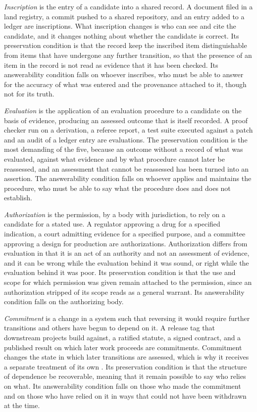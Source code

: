 \emph{Inscription} is the entry of a candidate into a shared record. A document filed in a land registry, a commit pushed to a shared repository, and an entry added to a ledger are inscriptions. What inscription changes is who can see and cite the candidate, and it changes nothing about whether the candidate is correct. Its preservation condition is that the record keep the inscribed item distinguishable from items that have undergone any further transition, so that the presence of an item in the record is not read as evidence that it has been checked. Its answerability condition falls on whoever inscribes, who must be able to answer for the accuracy of what was entered and the provenance attached to it, though not for its truth.

\emph{Evaluation} is the application of an evaluation procedure to a candidate on the basis of evidence, producing an assessed outcome that is itself recorded. A proof checker run on a derivation, a referee report, a test suite executed against a patch and an audit of a ledger entry are evaluations. The preservation condition is the most demanding of the five, because an outcome without a record of what was evaluated, against what evidence and by what procedure cannot later be reassessed, and an assessment that cannot be reassessed has been turned into an assertion. The answerability condition falls on whoever applies and maintains the procedure, who must be able to say what the procedure does and does not establish.

\emph{Authorization} is the permission, by a body with jurisdiction, to rely on a candidate for a stated use. A regulator approving a drug for a specified indication, a court admitting evidence for a specified purpose, and a committee approving a design for production are authorizations. Authorization differs from evaluation in that it is an act of an authority and not an assessment of evidence, and it can be wrong while the evaluation behind it was sound, or right while the evaluation behind it was poor. Its preservation condition is that the use and scope for which permission was given remain attached to the permission, since an authorization stripped of its scope reads as a general warrant. Its answerability condition falls on the authorizing body.

\emph{Commitment} is a change in a system such that reversing it would require further transitions and others have begun to depend on it. A release tag that downstream projects build against, a ratified statute, a signed contract, and a published result on which later work proceeds are commitments. Commitment changes the state in which later transitions are assessed, which is why it receives a separate treatment of its own \cite{admiss}. Its preservation condition is that the structure of dependence be recoverable, meaning that it remain possible to say who relies on what. Its answerability condition falls on those who made the commitment and on those who have relied on it in ways that could not have been withdrawn at the time.

